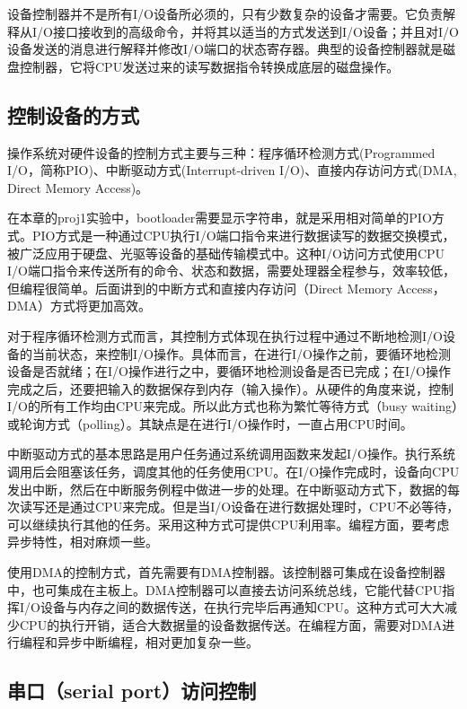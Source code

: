设备控制器并不是所有I/O设备所必须的，只有少数复杂的设备才需要。它负责解释从I/O接口接收到的高级命令，并将其以适当的方式发送到I/O设备；并且对I/O设备发送的消息进行解释并修改I/O端口的状态寄存器。典型的设备控制器就是磁盘控制器，它将CPU发送过来的读写数据指令转换成底层的磁盘操作。

\subsection{控制设备的方式}\label{ux63a7ux5236ux8bbeux5907ux7684ux65b9ux5f0f}

操作系统对硬件设备的控制方式主要与三种：程序循环检测方式(Programmed
I/O，简称PIO)、中断驱动方式(Interrupt-driven I/O)、直接内存访问方式(DMA,
Direct Memory Access)。

在本章的proj1实验中，bootloader需要显示字符串，就是采用相对简单的PIO方式。PIO方式是一种通过CPU执行I/O端口指令来进行数据读写的数据交换模式，被广泛应用于硬盘、光驱等设备的基础传输模式中。这种I/O访问方式使用CPU
I/O端口指令来传送所有的命令、状态和数据，需要处理器全程参与，效率较低，但编程很简单。后面讲到的中断方式和直接内存访问（Direct
Memory Access，DMA）方式将更加高效。

对于程序循环检测方式而言，其控制方式体现在执行过程中通过不断地检测I/O设备的当前状态，来控制I/O操作。具体而言，在进行I/O操作之前，要循环地检测设备是否就绪；在I/O操作进行之中，要循环地检测设备是否已完成；在I/O操作完成之后，还要把输入的数据保存到内存（输入操作）。从硬件的角度来说，控制I/O的所有工作均由CPU来完成。所以此方式也称为繁忙等待方式（busy
waiting）或轮询方式（polling）。其缺点是在进行I/O操作时，一直占用CPU时间。

中断驱动方式的基本思路是用户任务通过系统调用函数来发起I/O操作。执行系统调用后会阻塞该任务，调度其他的任务使用CPU。在I/O操作完成时，设备向CPU发出中断，然后在中断服务例程中做进一步的处理。在中断驱动方式下，数据的每次读写还是通过CPU来完成。但是当I/O设备在进行数据处理时，CPU不必等待，可以继续执行其他的任务。采用这种方式可提供CPU利用率。编程方面，要考虑异步特性，相对麻烦一些。

使用DMA的控制方式，首先需要有DMA控制器。该控制器可集成在设备控制器中，也可集成在主板上。DMA控制器可以直接去访问系统总线，它能代替CPU指挥I/O设备与内存之间的数据传送，在执行完毕后再通知CPU。这种方式可大大减少CPU的执行开销，适合大数据量的设备数据传送。在编程方面，需要对DMA进行编程和异步中断编程，相对更加复杂一些。

\subsection{串口（serial
port）访问控制}\label{ux4e32ux53e3serial-portux8bbfux95eeux63a7ux5236}

